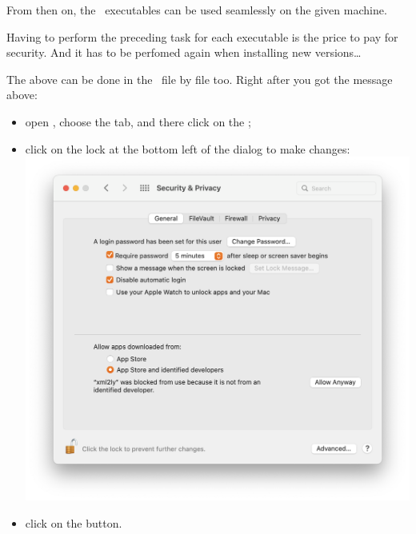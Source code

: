 From then on, the \mf\ executables can be used seamlessly on the given machine.

Having to perform the preceding task for each executable is the price to pay for security. And it has to be perfomed again when installing new versions\dots


The above can be done in the \GUI\ file by file too. Right after you got the message above:
\begin{itemize}
\item  open , choose the  tab, and there click on the ;

\item click on the lock at the bottom left of the dialog to make changes:\\
\includegraphics[scale=0.35]{../mfgraphics/mfgraphicsMacOSAllowAnyway.png}

\item click on the  button.

\end{itemize}

